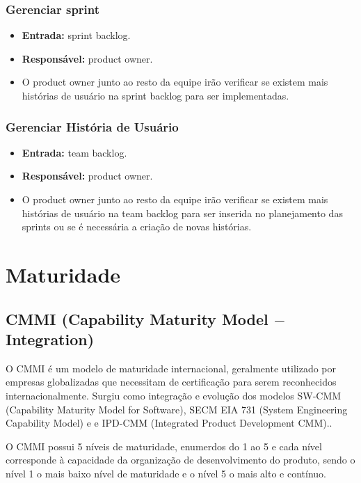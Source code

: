 \subsubsection{Gerenciar sprint}
  \begin{itemize}
    \item \textbf{Entrada:} sprint backlog.
    \item \textbf{Responsável:} product owner.
    \item O product owner junto ao resto da equipe irão verificar se existem mais histórias de usuário na sprint backlog para ser
      implementadas.
  \end{itemize}

\subsubsection{Gerenciar História de Usuário}
  \begin{itemize}
    \item \textbf{Entrada:} team backlog.
    \item \textbf{Responsável:} product owner.
    \item O product owner junto ao resto da equipe irão verificar se existem mais histórias de usuário na team backlog para ser
      inserida no planejamento das sprints ou se é necessária a criação de novas histórias.
  \end{itemize}

\section{Maturidade}

\subsection{CMMI (Capability Maturity Model $-$ Integration)}

  O CMMI é um modelo de maturidade internacional, geralmente utilizado por empresas
  globalizadas que necessitam de certificação para serem reconhecidos internacionalmente.
  Surgiu como integração e evolução dos modelos SW-CMM (Capability Maturity Model for Software),
  SECM EIA 731 (System Engineering Capability Model) e  e IPD-CMM
  (Integrated Product Development CMM).\cite{mct2006}.

  O CMMI possui 5 níveis de maturidade, enumerdos do 1 ao 5 e cada nível corresponde
  à capacidade da organização de desenvolvimento do produto, sendo o nível 1 o mais
  baixo nível de maturidade e o nível 5 o mais alto e contínuo.


